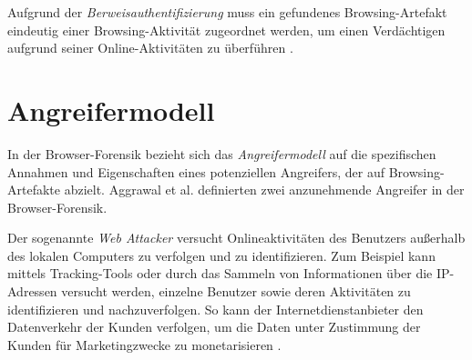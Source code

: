 Aufgrund der \textit{Berweisauthentifizierung} muss ein gefundenes Browsing-Artefakt eindeutig einer Browsing-Aktivität zugeordnet werden, um einen Verdächtigen aufgrund seiner Online-Aktivitäten zu überführen \cite{Mahlous.2020}. 



%
%

\section{Angreifermodell}\label{chap:theorie-angreifermodell}

In der Browser-Forensik bezieht sich das \textit{Angreifermodell} auf die spezifischen Annahmen und Eigenschaften eines potenziellen Angreifers, der auf Browsing-Artefakte abzielt. Aggrawal et al. \cite{Aggarwal.2010} definierten zwei anzunehmende Angreifer in der Browser-Forensik.

Der sogenannte \textit{Web Attacker} versucht Onlineaktivitäten des Benutzers außerhalb des lokalen Computers zu verfolgen und zu identifizieren. Zum Beispiel kann mittels Tracking-Tools oder durch das Sammeln von Informationen über die IP-Adressen versucht werden, einzelne Benutzer sowie deren Aktivitäten zu identifizieren und nachzuverfolgen. So kann der Internetdienstanbieter den Datenverkehr der Kunden verfolgen, um die Daten unter Zustimmung der Kunden für Marketingzwecke zu monetarisieren \cite{Aggarwal.2010}. 


